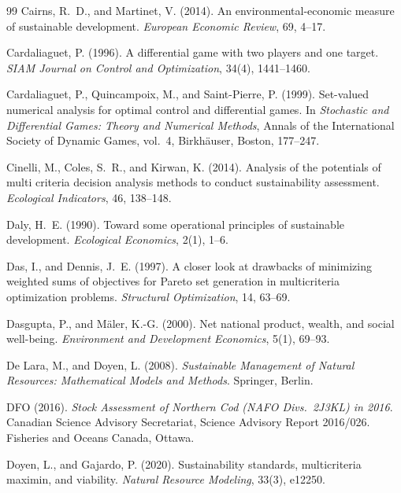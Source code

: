 \documentclass[preprint,11pt,authoryear]{elsarticle}
\theoremstyle{definition}
\theoremstyle{remark}
\begin{document}
\begin{thebibliography}{99}
 Cairns, R.~D., and Martinet, V. (2014). An environmental-economic measure of sustainable development. \emph{European Economic Review}, 69, 4--17.

 Cardaliaguet, P. (1996). A differential game with two players and one target. \emph{SIAM Journal on Control and Optimization}, 34(4), 1441--1460.

 Cardaliaguet, P., Quincampoix, M., and Saint-Pierre, P. (1999). Set-valued numerical analysis for optimal control and differential games. In \emph{Stochastic and Differential Games: Theory and Numerical Methods}, Annals of the International Society of Dynamic Games, vol.~4, Birkh\"auser, Boston, 177--247.

 Cinelli, M., Coles, S.~R., and Kirwan, K. (2014). Analysis of the potentials of multi criteria decision analysis methods to conduct sustainability assessment. \emph{Ecological Indicators}, 46, 138--148.

 Daly, H.~E. (1990). Toward some operational principles of sustainable development. \emph{Ecological Economics}, 2(1), 1--6.

 Das, I., and Dennis, J.~E. (1997). A closer look at drawbacks of minimizing weighted sums of objectives for Pareto set generation in multicriteria optimization problems. \emph{Structural Optimization}, 14, 63--69.

 Dasgupta, P., and M\"aler, K.-G. (2000). Net national product, wealth, and social well-being. \emph{Environment and Development Economics}, 5(1), 69--93.

 De Lara, M., and Doyen, L. (2008). \emph{Sustainable Management of Natural Resources: Mathematical Models and Methods}. Springer, Berlin.

 DFO (2016). \emph{Stock Assessment of Northern Cod (NAFO Divs.\ 2J3KL) in 2016}. Canadian Science Advisory Secretariat, Science Advisory Report 2016/026. Fisheries and Oceans Canada, Ottawa.

 Doyen, L., and Gajardo, P. (2020). Sustainability standards, multicriteria maximin, and viability. \emph{Natural Resource Modeling}, 33(3), e12250.


\end{thebibliography}
\end{document}
